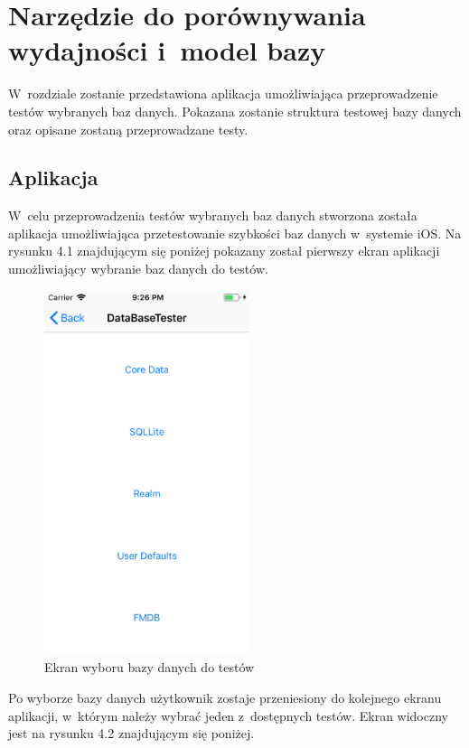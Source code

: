 \section{Narzędzie do porównywania wydajności i~model bazy }

 W~rozdziale zostanie przedstawiona aplikacja umożliwiająca przeprowadzenie testów wybranych baz danych. Pokazana zostanie struktura testowej bazy danych oraz opisane zostaną przeprowadzane testy.

\subsection{Aplikacja}

 W~celu przeprowadzenia testów wybranych baz danych stworzona została aplikacja umożliwiająca przetestowanie szybkości baz danych w~systemie iOS. Na rysunku 4.1 znajdującym się poniżej pokazany został pierwszy ekran aplikacji umożliwiający wybranie baz danych do testów. 

\begin{figure}[h]
\centering
	\includegraphics[width=6cm]{img/application/app-first-view.png}
	\caption{Ekran wyboru bazy danych do testów}
	\label{fig: first_app_view}
\end{figure}

Po wyborze bazy danych użytkownik zostaje przeniesiony do kolejnego ekranu aplikacji, w~którym należy wybrać jeden z~dostępnych testów. Ekran widoczny jest na rysunku 4.2 znajdującym się poniżej.

